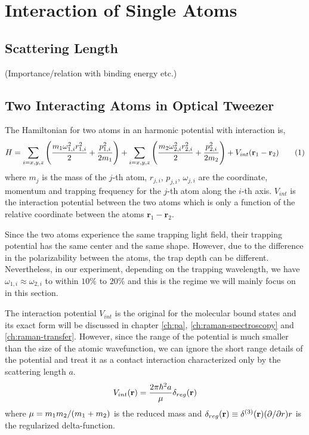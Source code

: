 
\chapter{Interaction of Single Atoms}
\label{ch:interaction-shift}

\section{Scattering Length}
\todo{}
(Importance/relation with binding energy etc.)

\section{Two Interacting Atoms in Optical Tweezer}

The Hamiltonian for two atoms in an harmonic potential with interaction is,
\[
  H=\sum_{i=x,y,z}\paren{\frac{m_{1}\omega_{1,i}^2r_{1,i}^2}{2}+\frac{p_{1,i}^2}{2m_{1}}}+\sum_{i=x,y,z}\paren{\frac{m_{2}\omega_{2,i}^2r_{2,i}^2}{2}+\frac{p_{2,i}^2}{2m_{2}}}+V_{int}\paren{\mathbf{r}_1-\mathbf{r}_2}\numberthis{eq:interaction-shift:orig-hamiltonian}
\]
where $m_j$ is the mass of the $j$-th atom,
$r_{j,i}$, $p_{j,i}$, $\omega_{j,i}$ are the coordinate, momentum and trapping frequency
for the $j$-th atom along the $i$-th axis.
$V_{int}$ is the interaction potential between the two atoms which is only a function
of the relative coordinate between the atoms $\mathbf{r}_1-\mathbf{r}_2$.

Since the two atoms experience the same trapping light field,
their trapping potential has the same center and the same shape.
However, due to the difference in the polarizability between the atoms,
the trap depth can be different.
Nevertheless, in our experiment, depending on the trapping wavelength,
we have $\omega_{1,i}\approx\omega_{2,i}$ to within $10\%$ to $20\%$
and this is the regime we will mainly focus on in this section.

The interaction potential $V_{int}$ is the original for
the molecular bound states and its exact form will be discussed in chapter \ref{ch:pa},
\ref{ch:raman-spectroscopy} and \ref{ch:raman-transfer}.
However, since the range of the potential is much smaller than
the size of the atomic wavefunction, we can ignore the short range details of the potential
and treat it as a contact interaction characterized only by the scattering length $a$.
\[
  V_{int}{\left({\mathbf{r}}\right)}=\frac{2\pi\hbar^2a}{\mu}\delta_{reg}{\left({\mathbf{r}}\right)}
\]
where $\mu = m_1m_2/{\left({m_1+m_2}\right)}$ is the reduced mass and
$\delta_{reg}{\left({\mathbf{r}}\right)}\equiv\delta^{(3)}{\left({\mathbf{r}}\right)}{\left({\partial/\partial r}\right)}r$
is the regularized delta-function.

